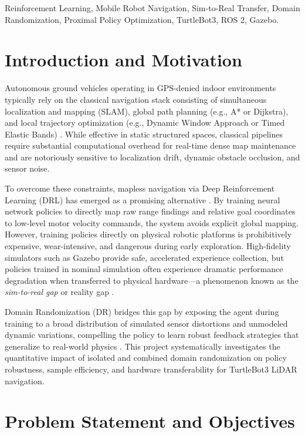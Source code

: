 \documentclass[conference]{IEEEtran}
\begin{document}
\begin{IEEEkeywords}
Reinforcement Learning, Mobile Robot Navigation, Sim-to-Real Transfer, Domain Randomization, Proximal Policy Optimization, TurtleBot3, ROS 2, Gazebo.
\end{IEEEkeywords}

\section{Introduction and Motivation}
Autonomous ground vehicles operating in GPS-denied indoor environments typically rely on the classical navigation stack consisting of simultaneous localization and mapping (SLAM), global path planning (e.g., A* or Dijkstra), and local trajectory optimization (e.g., Dynamic Window Approach or Timed Elastic Bands) \cite{macenski2022robot}. While effective in static structured spaces, classical pipelines require substantial computational overhead for real-time dense map maintenance and are notoriously sensitive to localization drift, dynamic obstacle occlusion, and sensor noise.

To overcome these constraints, mapless navigation via Deep Reinforcement Learning (DRL) has emerged as a promising alternative \cite{tai2017virtual}. By training neural network policies to directly map raw range findings and relative goal coordinates to low-level motor velocity commands, the system avoids explicit global mapping. However, training policies directly on physical robotic platforms is prohibitively expensive, wear-intensive, and dangerous during early exploration. High-fidelity simulators such as Gazebo \cite{koenig2004design} provide safe, accelerated experience collection, but policies trained in nominal simulation often experience dramatic performance degradation when transferred to physical hardware---a phenomenon known as the \textit{sim-to-real gap} or reality gap \cite{tobin2017domain, peng2018sim}.

Domain Randomization (DR) bridges this gap by exposing the agent during training to a broad distribution of simulated sensor distortions and unmodeled dynamic variations, compelling the policy to learn robust feedback strategies that generalize to real-world physics \cite{tobin2017domain, peng2018sim}. This project systematically investigates the quantitative impact of isolated and combined domain randomization on policy robustness, sample efficiency, and hardware transferability for TurtleBot3 LiDAR navigation.

\section{Problem Statement and Objectives}
\end{document}
